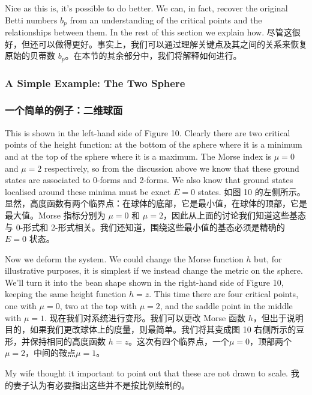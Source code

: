 \documentclass{article}
\begin{document}
\begin{paracol}{2}
Nice as this is, it’s possible to do better. We can, in fact, recover the original Betti numbers $b_p$ from an understanding of the critical points and the relationships between them. In the rest of this section we explain how.
\switchcolumn
尽管这很好，但还可以做得更好。事实上，我们可以通过理解关键点及其之间的关系来恢复原始的贝蒂数 $b_p$。在本节的其余部分中，我们将解释如何进行。
\switchcolumn*

\subsubsection*{A Simple Example: The Two Sphere}
\switchcolumn
\subsubsection*{一个简单的例子：二维球面}
\switchcolumn*

This is shown in the left-hand side of Figure 10. Clearly there are two critical points of the height function: at the bottom of the sphere where it is a minimum and at the top of the sphere where it is a maximum. The Morse index is $\mu = 0$ and $\mu = 2$ respectively, so from the discussion above we know that these ground states are associated to 0-forms and 2-forms. We also know that ground states localised around these minima must be exact $E = 0$ states.
\switchcolumn
如图 10 的左侧所示。显然，高度函数有两个临界点：在球体的底部，它是最小值，在球体的顶部，它是最大值。Morse 指标分别为 $\mu = 0$ 和 $\mu = 2$，因此从上面的讨论我们知道这些基态与 0-形式和 2-形式相关。我们还知道，围绕这些最小值的基态必须是精确的 $E = 0$ 状态。
\switchcolumn*

Now we deform the system. We could change the Morse function $h$ but, for illustrative purposes, it is simplest if we instead change the metric on the sphere. We’ll turn it into the bean shape shown in the right-hand side of Figure 10, keeping the same height function $h = z$. This time there are four critical points, one with $\mu = 0$, two at the top with $\mu = 2$, and the saddle point in the middle with $\mu = 1$.
\switchcolumn
现在我们对系统进行变形。我们可以更改 Morse 函数 $h$，但出于说明目的，如果我们更改球体上的度量，则最简单。我们将其变成图 10 右侧所示的豆形，并保持相同的高度函数 $h = z$。这次有四个临界点，一个$\mu = 0$，顶部两个$\mu = 2$，中间的鞍点$\mu = 1$。
\switchcolumn*

My wife thought it important to point out that these are not drawn to scale.
\switchcolumn
我的妻子认为有必要指出这些并不是按比例绘制的。
\switchcolumn*


\end{paracol}
\end{document}
